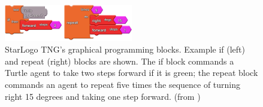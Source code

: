 \documentclass[runningheads,a4paper]{llncs}
\begin{document}
  \begin{figure}[H]
	\centering
  \includegraphics[width=0.5\textwidth]{images/StarLogoTNGBlocksEx.PNG}
	\caption{ StarLogo TNG’s graphical programming blocks. Example if (left) and repeat (right) blocks are shown. The
	  if block commands a Turtle agent to take two steps forward if it is green; the repeat block commands an agent to
	  repeat five times the sequence of turning right 15 degrees and taking one step forward. (from \cite{smith2011biology})}
	\label{fig1}
  \end{figure}
  
\end{document}
